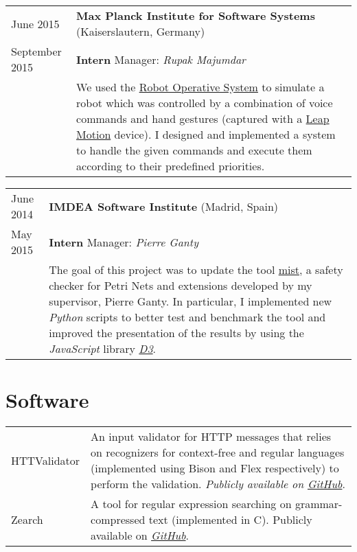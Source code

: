 \documentclass[a4paper,10pt]{article} %
\begin{document}
\begin{tabular}{p{2.5cm}p{13.2cm}}
{\small June 2015} & \textbf{Max Planck Institute for Software Systems} (Kaiserslautern, Germany) \\
{\small September 2015} & \textcolor{azureblue}{\textbf{Intern}} \hfill Manager: \emph{Rupak Majumdar} \\
& We used the \href{https://www.ros.org/}{Robot Operative System} to simulate a robot which was controlled by a combination of voice commands and hand gestures (captured with a \href{https://www.leapmotion.com/}{Leap Motion} device).
I designed and implemented a system to handle the given commands and execute them according to their predefined priorities.
\end{tabular}

\begin{tabular}{p{2.5cm}p{13.2cm}}
{\small June 2014} & \textbf{IMDEA Software Institute} (Madrid, Spain) \\
{\small May 2015} & \textcolor{azureblue}{\textbf{Intern}} \hfill Manager: \emph{Pierre Ganty}\\
& The goal of this project was to update the tool \href{https://github.com/pierreganty/mist/wiki}{mist}, a safety checker for Petri Nets and extensions developed by my supervisor, Pierre Ganty.
In particular, I implemented new \emph{Python} scripts to better test and benchmark the tool and improved the presentation of the results by using the \emph{JavaScript} library \href{https://d3js.org/}{\emph{D3}}. 
\end{tabular}

\section{Software}

\begin{tabular}{p{2.5cm}p{13.2cm}}
{\small HTTValidator} & An input validator for HTTP messages that relies on recognizers for context-free and regular languages (implemented using Bison and Flex respectively) to perform the validation. \emph{Publicly available on \href{https://github.com/pevalme/HTTPValidator}{GitHub}}. \\

{\small Zearch} & A tool for regular expression searching on grammar-compressed text (implemented in C). Publicly available on \emph{\href{https://github.com/pevalme/zearch}{GitHub}}.\\
\end{tabular}
\end{document}
